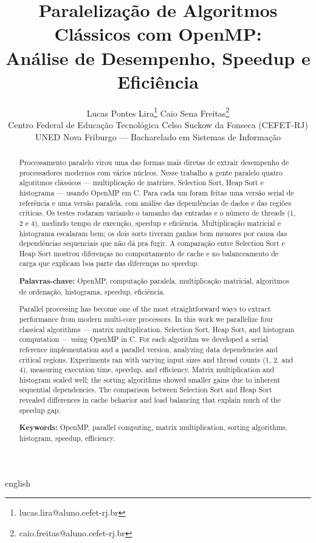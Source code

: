 \documentclass[12pt]{article}
\title{\textbf{Paralelização de Algoritmos Clássicos com OpenMP:}\\
\large Análise de Desempenho, Speedup e Eficiência}
\author{
    Lucas Pontes Lira\thanks{lucas.lira@aluno.cefet-rj.br} \quad
    Caio Sena Freitas\thanks{caio.freitas@aluno.cefet-rj.br}\\[0.3em]
    \small Centro Federal de Educação Tecnológica Celso Suckow da Fonseca (CEFET-RJ)\\
    \small UNED Nova Friburgo --- Bacharelado em Sistemas de Informação
}
\date{}
\begin{document}
\maketitle

\begin{abstract}
Processamento paralelo virou uma das formas mais diretas de extrair desempenho de processadores modernos com vários núcleos. Nesse trabalho a gente paralelo quatro algoritmos clássicos --- multiplicação de matrizes, Selection Sort, Heap Sort e histograma --- usando OpenMP em C. Para cada um foram feitas uma versão serial de referência e uma versão paralela, com análise das dependências de dados e das regiões críticas. Os testes rodaram variando o tamanho das entradas e o número de threads (1, 2 e 4), medindo tempo de execução, speedup e eficiência. Multiplicação matricial e histograma escalaram bem; os dois sorts tiveram ganhos bem menores por causa das dependências sequenciais que não dá pra fugir. A comparação entre Selection Sort e Heap Sort mostrou diferenças no comportamento de cache e no balanceamento de carga que explicam boa parte das diferenças no speedup.

\medskip
\noindent\textbf{Palavras-chave:} OpenMP, computação paralela, multiplicação matricial, algoritmos de ordenação, histograma, speedup, eficiência.
\end{abstract}

\begin{otherlanguage*}{english}
\begin{abstract}
Parallel processing has become one of the most straightforward ways to extract performance from modern multi-core processors. In this work we parallelize four classical algorithms --- matrix multiplication, Selection Sort, Heap Sort, and histogram computation --- using OpenMP in C. For each algorithm we developed a serial reference implementation and a parallel version, analyzing data dependencies and critical regions. Experiments ran with varying input sizes and thread counts (1, 2, and 4), measuring execution time, speedup, and efficiency. Matrix multiplication and histogram scaled well; the sorting algorithms showed smaller gains due to inherent sequential dependencies. The comparison between Selection Sort and Heap Sort revealed differences in cache behavior and load balancing that explain much of the speedup gap.

\medskip
\noindent\textbf{Keywords:} OpenMP, parallel computing, matrix multiplication, sorting algorithms, histogram, speedup, efficiency.
\end{abstract}
\end{otherlanguage*}
\end{document}
